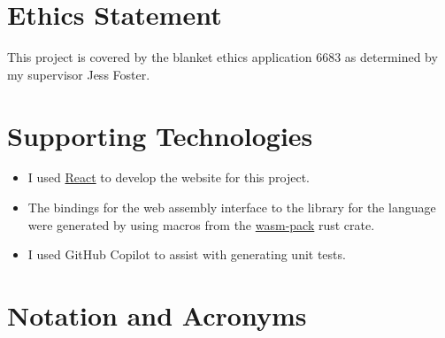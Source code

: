 
\makedecl
\makeaidecl
\tableofcontents
\listoffigures


\chapter*{Ethics Statement}
This project is covered by the blanket ethics application 6683 as determined by my supervisor Jess Foster. 


\chapter*{Supporting Technologies}
\label{chap:supporting_tech}

\noindent
\begin{itemize}
\item I used \href{https://react.dev/}{React} to develop the website for this project.
\item The bindings for the web assembly interface to the library for the language were generated by using macros from the \href{https://github.com/rustwasm/wasm-pack}{wasm-pack} rust crate.
\item I used GitHub Copilot to assist with generating unit tests.
\end{itemize}


\chapter*{Notation and Acronyms}
\begin{acronym}
\end{acronym}